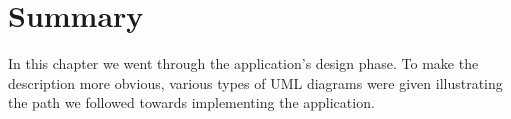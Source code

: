 \section{Summary}

In this chapter we went through the application's design phase. To make the description more obvious, various types of UML diagrams were given illustrating the path we followed towards implementing the application.


